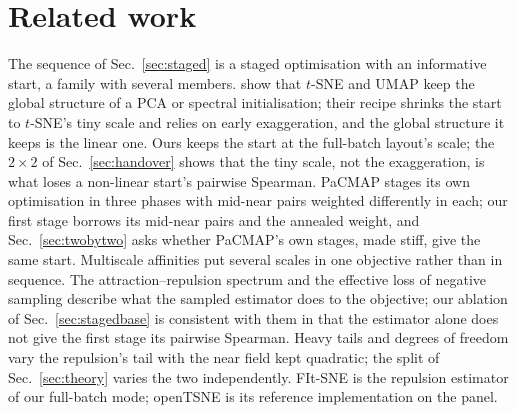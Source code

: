 \documentclass[11pt]{article}
\begin{document}
\section{Related work}
The sequence of Sec.~\ref{sec:staged} is a staged optimisation with an informative start, a family with
several members. \citet{kobak2021init} show that $t$-SNE and UMAP keep the global structure of a PCA or
spectral initialisation; their recipe shrinks the start to $t$-SNE's tiny scale and relies on early
exaggeration, and the global structure it keeps is the linear one. Ours keeps the start at the
full-batch layout's scale; the $2 \times 2$ of Sec.~\ref{sec:handover} shows that the tiny scale, not
the exaggeration, is what loses a non-linear start's pairwise Spearman. PaCMAP
\citep{wang2021pacmap} stages its own optimisation in three phases with mid-near pairs weighted
differently in each; our first stage borrows its mid-near pairs and the annealed weight, and
Sec.~\ref{sec:twobytwo} asks whether PaCMAP's own stages, made stiff, give the same start. Multiscale
affinities \citep{lee2015multiscale} put several scales in one objective rather than in sequence. The
attraction--repulsion spectrum \citep{boehm2022attraction} and the effective loss of negative sampling
\citep{damrich2021umap, damrich2023contrastive} describe what the sampled estimator does to the
objective; our ablation of Sec.~\ref{sec:stagedbase} is consistent with them in that the estimator alone
does not give the first stage its pairwise Spearman. Heavy tails and degrees of freedom
\citep{kobak2020heavy} vary the repulsion's tail with the near field kept quadratic; the split of
Sec.~\ref{sec:theory} varies the two independently. FIt-SNE \citep{linderman2019fitsne} is the
repulsion estimator of our full-batch mode; openTSNE is its reference implementation on the panel.
\end{document}
